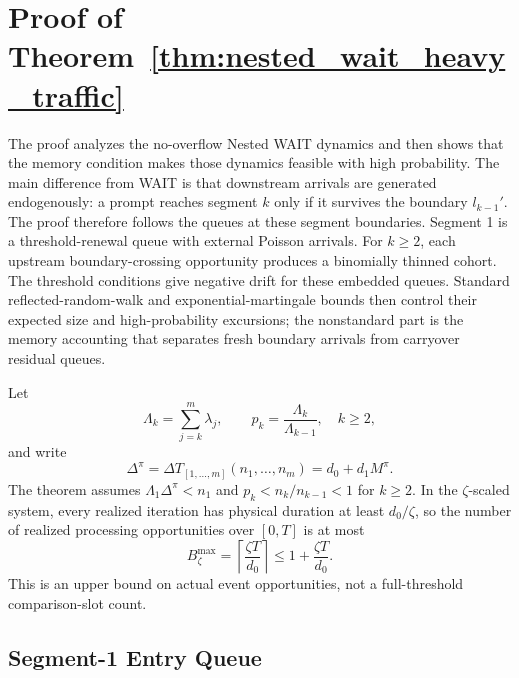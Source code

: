 
\section{Proof of Theorem~\ref{thm:nested_wait_heavy_traffic}}\label{appendix::proof of nested_wait_heavy_traffic}

The proof analyzes the no-overflow Nested WAIT dynamics and then shows that the memory condition makes those dynamics feasible with high probability. The main difference from WAIT is that downstream arrivals are generated endogenously: a prompt reaches segment \(k\) only if it survives the boundary \(l_{k-1}'\). The proof therefore follows the queues at these segment boundaries. Segment 1 is a threshold-renewal queue with external Poisson arrivals. For \(k\ge2\), each upstream boundary-crossing opportunity produces a binomially thinned cohort. The threshold conditions give negative drift for these embedded queues. Standard reflected-random-walk and exponential-martingale bounds then control their expected size and high-probability excursions; the nonstandard part is the memory accounting that separates fresh boundary arrivals from carryover residual queues.

Let
\[
    \Lambda_k=\sum_{j=k}^m\lambda_j,\qquad
    p_k=\frac{\Lambda_k}{\Lambda_{k-1}},\quad k\ge2,
\]
and write
\[
    \Delta^\pi=\Delta T_{[1,\ldots,m]}(n_1,\ldots,n_m)=d_0+d_1M^\pi .
\]
The theorem assumes \(\Lambda_1\Delta^\pi<n_1\) and \(p_k<n_k/n_{k-1}<1\) for \(k\ge2\). In the \(\zeta\)-scaled system, every realized iteration has physical duration at least \(d_0/\zeta\), so the number of realized processing opportunities over \([0,T]\) is at most
\[
    B_\zeta^{\max}=\left\lceil \frac{\zeta T}{d_0}\right\rceil
    \le 1+\frac{\zeta T}{d_0}.
\]
This is an upper bound on actual event opportunities, not a full-threshold comparison-slot count.

\subsection{Segment-1 Entry Queue}

